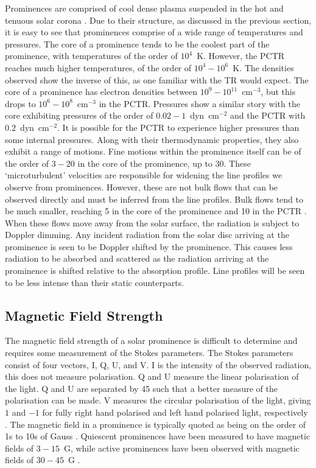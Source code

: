 Prominences are comprised of cool dense plasma suspended in the hot and tenuous solar corona \citep{labrosse_physics_2010}. Due to their structure, as discussed in the previous section, it is easy to see that prominences comprise of a wide range of temperatures and pressures. The core of a prominence tends to be the coolest part of the prominence, with temperatures of the order of $10^4$~K. However, the PCTR reaches much higher temperatures, of the order of $10^4-10^6$~K. The densities observed show the inverse of this, as one familiar with the TR would expect. The core of a prominence has electron densities between $10^9-10^11$~cm$^{-3}$, but this drops to $10^6-10^8$~cm$^{-3}$ in the PCTR. Pressures show a similar story with the core exhibiting pressures of the order of $0.02-1$~dyn~cm$^{-2}$ and the PCTR with $0.2$~dyn~cm$^{-2}$. It is possible for the PCTR to experience higher pressures than some internal pressures. Along with their thermodynamic properties, they also exhibit a range of motions. Fine motions within the prominence itself can be of the order of $3-20$\kms{} in the core of the prominence, up to 30\kms{}. These `microturbulent' velocities are responsible for widening the line profiles we observe from prominences. However, these are not bulk flows that can be observed directly and must be inferred from the line profiles. Bulk flows tend to be much smaller, reaching 5\kms{} in the core of the prominence and 10\kms{} in the PCTR \citep{labrosse_physics_2010}. When these flows move away from the solar surface, the radiation is subject to Doppler dimming. Any incident radiation from the solar disc arriving at the prominence is seen to be Doppler shifted by the prominence. This causes less radiation to be absorbed and scattered as the radiation arriving at the prominence is shifted relative to the absorption profile. Line profiles will be seen to be less intense than their static counterparts. 

\subsection{Magnetic Field Strength}

The magnetic field strength of a solar prominence is difficult to determine and requires some measurement of the Stokes parameters. The Stokes parameters consist of four vectors, I, Q, U, and V. I is the intensity of the observed radiation, this does not measure polarisation. Q and U measure the linear polarisation of the light. Q and U are separated by 45\degr{} such that a better measure of the polarisation can be made. V measures the circular polarisation of the light, giving $1$ and $-1$ for fully right hand polarised and left hand polarised light, respectively \citep{toro_iniesta_introduction_2007}.
The magnetic field in a prominence is typically quoted as being on the order of 1s to 10s of Gauss \citep{tandberg-hanssen_nature_1995}. Quiescent prominences have been measured to have magnetic fields of $3-15$~G, while active prominences have been observed with magnetic fields of $30-45$~G \citep{mackay_physics_2010}.



